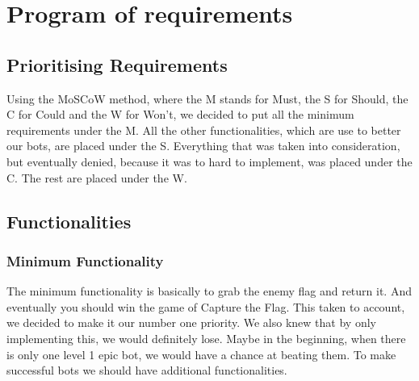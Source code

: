 \chapter{Program of requirements}

\section{Prioritising Requirements}
Using the MoSCoW method, where the M stands for Must, the S for Should, the C for Could and the W for Won't, we decided to put all the minimum requirements under the M. All the other functionalities, which are use to better our bots, are placed under the S. Everything that was taken into consideration, but eventually denied, because it was to hard to implement, was placed under the C. The rest are placed under the W.\\

\section{Functionalities}

\subsection{Minimum Functionality}
The minimum functionality is basically to grab the enemy flag and return it. And eventually you should win the game of Capture the Flag. This taken to account, we decided to make it our number one priority. We also knew that by only implementing this, we would definitely lose. Maybe in the beginning, when there is only one level 1 epic bot, we would have a chance at beating them. To make successful bots we should have additional functionalities.\\ 


